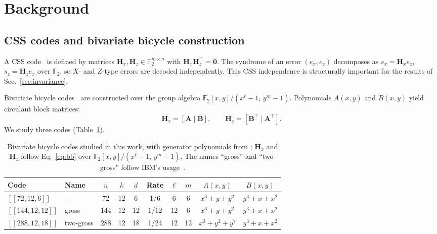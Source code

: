 \documentclass[a4paper,twocolumn,11pt,nopdfoutputerror]{quantumarticle}
\newcommand{\F}{\mathbb{F}}
\newcommand{\Hmat}{\mathbf{H}}
\newcommand{\code}[3]{\ensuremath{[\![#1,#2,#3]\!]}}
\begin{document}
\section{Background}\label{sec:background}

\subsection{CSS codes and bivariate bicycle construction}

A CSS code~\cite{Calderbank1996Good,Steane1996Error} is defined by
matrices $\Hmat_x, \Hmat_z \in \F_2^{m \times n}$ with
$\Hmat_x \Hmat_z^\top = \mathbf{0}$. The syndrome of an error
$(e_x, e_z)$ decomposes as
$s_x = \Hmat_x e_z$,
$s_z = \Hmat_z e_x$
over $\F_2$, so $X$- and $Z$-type errors are decoded independently.
This CSS independence is structurally important for the results
of Sec.~\ref{sec:invariance}.

Bivariate bicycle codes~\cite{Bravyi2024Memory} are constructed
over the group algebra $\F_2[x,y]/(x^\ell-1,\,y^m-1)$. Polynomials
$A(x,y)$ and $B(x,y)$ yield circulant block matrices:
\begin{equation}
\Hmat_x = [\mathbf{A} \mid \mathbf{B}], \qquad
\Hmat_z = [\mathbf{B}^\top \mid \mathbf{A}^\top].
\label{eq:bb}
\end{equation}
We study three codes (Table~\ref{tab:codes}).

\begin{table}[t]
\centering
\caption{Bivariate bicycle codes studied in this work, with
         generator polynomials from \cite{Bravyi2024Memory};
         $\Hmat_x$ and $\Hmat_z$ follow Eq.~\eqref{eq:bb} over
         $\F_2[x,y]/(x^\ell-1,\,y^m-1)$. The names ``gross'' and
         ``two-gross'' follow IBM's usage~\cite{Yoder2025TourDeGross}.}
\label{tab:codes}
\begin{tabular}{@{}llcccccccc@{}}
\toprule
Code & Name & $n$ & $k$ & $d$ & Rate & $\ell$ & $m$ & $A(x,y)$ & $B(x,y)$ \\
\midrule
$\code{72}{12}{6}$   & ---       &  72 & 12 &  6 & 1/6  &  6 &  6 & $x^3+y+y^2$   & $y^3+x+x^2$ \\
$\code{144}{12}{12}$ & gross     & 144 & 12 & 12 & 1/12 & 12 &  6 & $x^3+y+y^2$   & $y^3+x+x^2$ \\
$\code{288}{12}{18}$ & two-gross & 288 & 12 & 18 & 1/24 & 12 & 12 & $x^3+y^2+y^7$ & $y^3+x+x^2$ \\
\bottomrule
\end{tabular}
\end{table}
\end{document}
